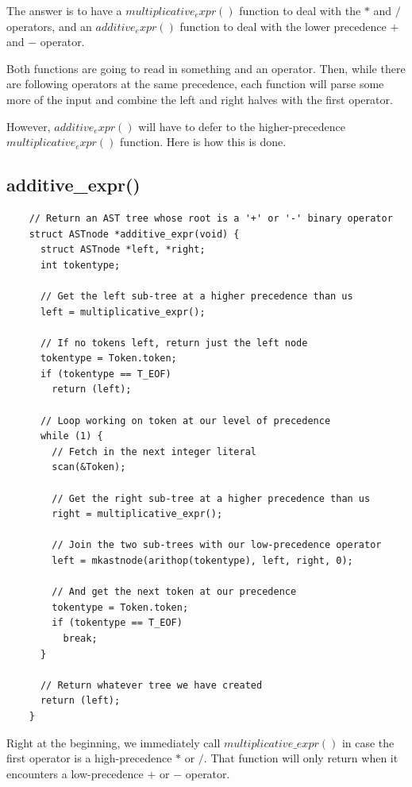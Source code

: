\documentclass[a4paper,12pt]{article}
\begin{document}
The answer is to have a $multiplicative_expr()$ function to deal with the $*$ and $/$ operators, and an $additive_expr()$ function to deal with the lower precedence $+$ and $-$ operator.

Both functions are going to read in something and an operator. Then, while there are following operators at the same precedence, each function will parse some more of the input and combine the left and right halves with the first operator.

However, $additive_expr()$ will have to defer to the higher-precedence $multiplicative_expr()$ function. Here is how this is done.

\subsection{additive\_expr()}

\begin{lstlisting}
    // Return an AST tree whose root is a '+' or '-' binary operator
    struct ASTnode *additive_expr(void) {
      struct ASTnode *left, *right;
      int tokentype;

      // Get the left sub-tree at a higher precedence than us
      left = multiplicative_expr();

      // If no tokens left, return just the left node
      tokentype = Token.token;
      if (tokentype == T_EOF)
        return (left);

      // Loop working on token at our level of precedence
      while (1) {
        // Fetch in the next integer literal
        scan(&Token);

        // Get the right sub-tree at a higher precedence than us
        right = multiplicative_expr();

        // Join the two sub-trees with our low-precedence operator
        left = mkastnode(arithop(tokentype), left, right, 0);

        // And get the next token at our precedence
        tokentype = Token.token;
        if (tokentype == T_EOF)
          break;
      }

      // Return whatever tree we have created
      return (left);
    }
\end{lstlisting}

Right at the beginning, we immediately call $multiplicative\_expr()$ in case the first operator is a high-precedence $*$ or $/$. That function will only return when it encounters a low-precedence $+$ or $-$ operator.
\end{document}
